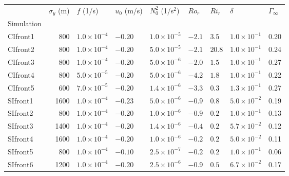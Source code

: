 \begin{tabular}{lrlllllll}
\toprule
{} &  $\sigma_y$ (m) &             $f$ (1/s) & $u_0$ (m/s) &     $N^2_0$ (1/s$^2$) &  $Ro_r$ &  $Ri_r$ &              $\delta$ & $\Gamma_\infty$ \\
Simulation &                 &                       &             &                       &         &         &                       &                 \\
\midrule
CIfront1   &             800 &  $1.0 \times 10^{-4}$ &     $-0.20$ &  $1.0 \times 10^{-5}$ &  $-2.1$ &   $3.5$ &  $1.0 \times 10^{-1}$ &            0.20 \\
CIfront2   &             800 &  $1.0 \times 10^{-4}$ &     $-0.20$ &  $5.0 \times 10^{-5}$ &  $-2.1$ &  $20.8$ &  $1.0 \times 10^{-1}$ &            0.24 \\
CIfront3   &             800 &  $1.0 \times 10^{-4}$ &     $-0.20$ &  $5.0 \times 10^{-6}$ &  $-2.0$ &   $1.5$ &  $1.0 \times 10^{-1}$ &            0.27 \\
CIfront4   &             800 &  $5.0 \times 10^{-5}$ &     $-0.20$ &  $5.0 \times 10^{-6}$ &  $-4.2$ &   $1.8$ &  $1.0 \times 10^{-1}$ &            0.22 \\
CIfront5   &             600 &  $7.0 \times 10^{-5}$ &     $-0.20$ &  $1.4 \times 10^{-6}$ &  $-3.3$ &   $0.3$ &  $1.3 \times 10^{-1}$ &            0.27 \\
SIfront1   &            1600 &  $1.0 \times 10^{-4}$ &     $-0.23$ &  $5.0 \times 10^{-6}$ &  $-0.9$ &   $0.8$ &  $5.0 \times 10^{-2}$ &            0.19 \\
SIfront2   &             800 &  $1.0 \times 10^{-4}$ &     $-0.20$ &  $1.0 \times 10^{-6}$ &  $-0.9$ &   $0.2$ &  $1.0 \times 10^{-1}$ &            0.13 \\
SIfront3   &            1400 &  $1.0 \times 10^{-4}$ &     $-0.20$ &  $1.4 \times 10^{-6}$ &  $-0.4$ &   $0.2$ &  $5.7 \times 10^{-2}$ &            0.12 \\
SIfront4   &            1600 &  $1.0 \times 10^{-4}$ &     $-0.20$ &  $1.0 \times 10^{-6}$ &  $-0.2$ &   $0.2$ &  $5.0 \times 10^{-2}$ &            0.11 \\
SIfront5   &             800 &  $1.0 \times 10^{-4}$ &     $-0.10$ &  $2.5 \times 10^{-7}$ &  $-0.2$ &   $0.2$ &  $1.0 \times 10^{-1}$ &            0.06 \\
SIfront6   &            1200 &  $1.0 \times 10^{-4}$ &     $-0.20$ &  $2.5 \times 10^{-6}$ &  $-0.9$ &   $0.5$ &  $6.7 \times 10^{-2}$ &            0.17 \\
\bottomrule
\end{tabular}
